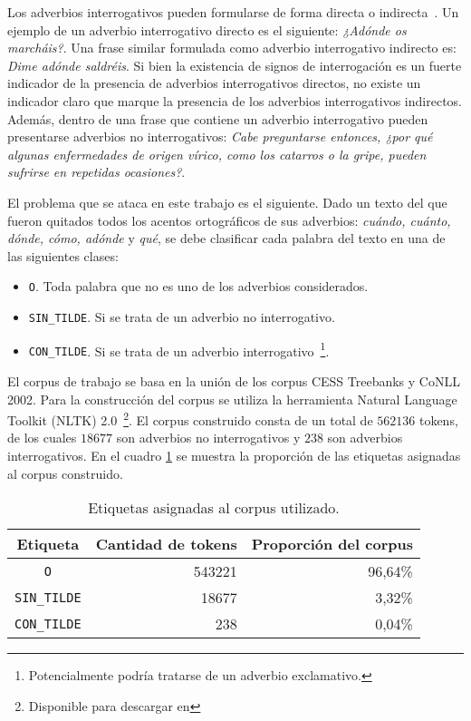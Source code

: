 \documentclass[runningheads,a4paper]{llncs}
\begin{document}
Los adverbios interrogativos pueden formularse de forma directa o indirecta~\cite{VECIANA04}. Un ejemplo de un adverbio interrogativo directo es el siguiente: \emph{¿Adónde os marcháis?}. Una frase similar formulada como adverbio interrogativo indirecto es: \emph{Dime adónde saldréis}. Si bien la existencia de signos de interrogación es un fuerte indicador de la presencia de adverbios interrogativos directos, no existe un indicador claro que marque la presencia de los adverbios interrogativos indirectos. Además, dentro de una frase que contiene un adverbio interrogativo pueden presentarse adverbios no interrogativos: \emph{Cabe preguntarse entonces, ¿por qué algunas enfermedades de origen vírico, como los catarros o la gripe, pueden sufrirse en repetidas ocasiones?}.

El problema que se ataca en este trabajo es el siguiente. Dado un texto del que fueron quitados todos los acentos ortográficos de sus adverbios: \emph{cuándo, cuánto, dónde, cómo, adónde} y \emph{qué}, se debe clasificar cada palabra del texto en una de las siguientes clases: 
\begin{itemize}
	\item {\texttt{O}}. Toda palabra que no es uno de los adverbios considerados.
	\item {\texttt{SIN\_TILDE}}. Si se trata de un adverbio no interrogativo.
	\item {\texttt{CON\_TILDE}}. Si se trata de un adverbio interrogativo~\footnote{Potencialmente podr\'ia tratarse de un adverbio exclamativo.}.
\end{itemize}

El corpus de trabajo se basa en la unión de los corpus CESS Treebanks y CoNLL 2002. Para la construcción del corpus se utiliza la herramienta Natural Language Toolkit (NLTK) 2.0~\footnote{Disponible para descargar en \nltk}. El corpus construido consta de un total de $562136$ tokens, de los cuales $18677$ son adverbios no interrogativos y $238$ son adverbios interrogativos. En el cuadro \ref{table:corpus} se muestra la proporci\'on de las etiquetas asignadas al corpus construido.

\begin{table}[ht]
 	\renewcommand{\arraystretch}{1.3}
	\renewcommand{\tabcolsep}{3pt}
	\caption{Etiquetas asignadas al corpus utilizado.}
	\label{table:corpus}
	\centering
	\begin{tabular}{c r r}
		\hline\hline
		\multicolumn{1}{c}{\textbf{Etiqueta}} & \multicolumn{1}{c}{\textbf{Cantidad de tokens}} & \multicolumn{1}{c}{\textbf{Proporci\'on del corpus}} \\
		\hline
		\texttt{O} & 543221 & 96,64\% \\
		\texttt{SIN\_TILDE} & 18677 & 3,32\% \\
		\texttt{CON\_TILDE} & 238 & 0,04\% \\
		\hline
	\end{tabular}
\end{table}
\end{document}
